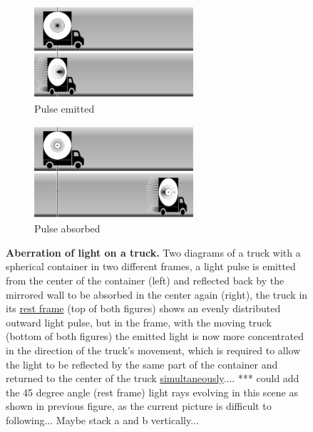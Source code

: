 \begin{figure}[htbp]
	\centering
	\begin{subfigure}{.49\textwidth}
		\centering
		\includegraphics[width = 5.9cm]{images/pdf/Aberrated_lorrys_1.pdf}
		\caption{Pulse emitted}
		\label{fig: truck aberrated 1}
	\end{subfigure}
	\begin{subfigure}{.49\textwidth}
		\centering
		\includegraphics[width = 5.9cm]{images/pdf/Aberrated_lorrys_2.pdf}
		\caption{Pulse absorbed}
		\label{fig: truck aberrated 2}
	\end{subfigure}
	\caption{\textbf{Aberration of light on a truck.} Two diagrams of a truck with a spherical container in two different frames, a light pulse is emitted from the center of the container (left) and reflected back by the mirrored wall to be absorbed in the center again (right), the truck in its \protect\hyperlink{def-proper-frame}{rest frame} (top of both figures) shows an evenly distributed outward light pulse, but in the frame, with the moving truck (bottom of both figures) the emitted light is now more concentrated in the direction of the truck's movement, which is required to allow the light to be reflected by the same part of the container and returned to the center of the truck \protect\hyperlink{def-simultaneity}{simultaneously}.... *** could add the 45 degree angle (rest frame) light rays evolving in this scene as shown in previous figure, as the current picture is difficult to following... Maybe stack a and b vertically... }
	\label{fig: truck aberrated}
\end{figure}

%

